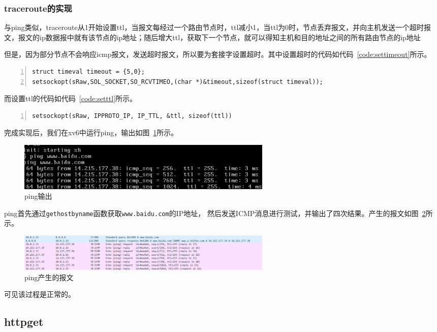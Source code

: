 \documentclass[a4paper,twoside]{ctexrep}
\begin{document}
\begin{spacing}{1.2}
\subsubsection{traceroute的实现}

与ping类似，traceroute从1开始设置ttl，当报文每经过一个路由节点时，ttl减小1，当ttl为0时，节点丢弃报文，并向主机发送一个超时报文，报文的ip数据报中就有该节点的ip地址；随后增大ttl，获取下一个节点，就可以得知主机和目的地址之间的所有路由节点的ip地址

但是，因为部分节点不会响应icmp报文，发送超时报文，所以要为套接字设置超时。其中设置超时的代码如代码~\ref{code:settimeout}所示。
\begin{lstlisting}[numbers=left,style=CppStyle,caption={设置超时},label={code:settimeout}]
struct timeval timeout = {5,0};
setsockopt(sRaw,SOL_SOCKET,SO_RCVTIMEO,(char *)&timeout,sizeof(struct timeval));
\end{lstlisting}
而设置ttl的代码如代码~\ref{code:setttl}所示。
\begin{lstlisting}[numbers=left,style=CppStyle,caption={设置TTL},label={code:setttl}]
	setsockopt(sRaw, IPPROTO_IP, IP_TTL, &ttl, sizeof(ttl))
\end{lstlisting}

完成实现后，我们在xv6中运行ping，输出如图~\ref{fig:ping}所示。
\begin{figure}[htb]
	\centering
	\caption{ping输出}
	\label{fig:ping}
	\includegraphics[width=0.6\textwidth]{ping.png}
\end{figure}
ping首先通过\texttt{gethostbyname}函数获取\texttt{www.baidu.com}的IP地址，
然后发送ICMP消息进行测试，并输出了四次结果。产生的报文如图~\ref{fig:pingpacket}所示。
\begin{figure}[htb]
	\centering
	\caption{ping产生的报文}
	\label{fig:pingpacket}
	\includegraphics[width=0.6\textwidth]{pingpack.png}
\end{figure}
可见该过程是正常的。

\subsection{httpget}


\end{spacing}
\end{document}
